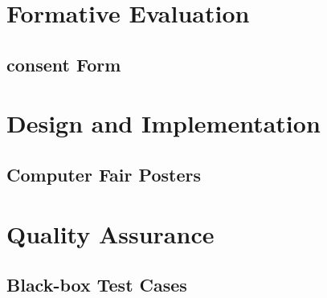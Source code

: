 \documentclass[12pt,a4paper]{article}
\begin{document}
\begin{appendices}
      \section{Formative Evaluation}
        \subsection{consent Form}\label{appendix:consent-form}
          
          
      \section{Design and Implementation}
        \subsection{Computer Fair Posters}\label{appendix:computer-fair-posters}
          
          
          
        
      \section{Quality Assurance}
        \subsection{Black-box Test Cases}\label{appendix:black-box-test-cases}
        
    \end{appendices}

  
\end{document}
